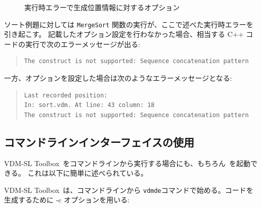 \documentclass[\pformat,12pt]{jarticle}
\newcommand{\ToolboxName}{VDM-SL Toolbox}
\newcommand{\vdmde}{vdmde}
\begin{document}
\begin{figure}[tbh]
\begin{center}
\mbox{}
\caption{実行時エラーで生成位置情報に対するオプション}\label{fig:option}
\end{center}
\end{figure}
  
ソート例題に対しては \texttt{MergeSort} 関数の実行が、ここで述べた実行時エラーを引き起こす。
記載したオプション設定を行わなかった場合、相当する C++ コードの実行で次のエラーメッセージが出る:
\begin{quote}
\begin{verbatim}
The construct is not supported: Sequence concatenation pattern
\end{verbatim}
\end{quote}
一方、オプションを設定した場合は次のようなエラーメッセージとなる:
\begin{quote}
\begin{verbatim}
Last recorded position:
In: sort.vdm. At line: 43 column: 18
The construct is not supported: Sequence concatenation pattern
\end{verbatim}
\end{quote}

\subsection{コマンドラインインターフェイスの使用}\label{commandline}

 \ToolboxName\ をコマンドラインから実行する場合にも、もちろん\Tcg\ を起動できる。
これは以下に簡単に述べられている。

\ToolboxName\ は、コマンドラインから {\tt  \vdmde}コマンドで始める。コードを生成するために -c オプションを用いる:
\end{document}
